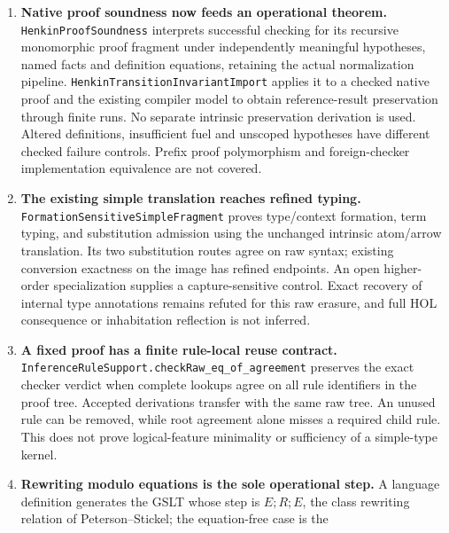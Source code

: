 \documentclass[11pt]{article}
\theoremstyle{definition}
\theoremstyle{remark}
\begin{document}
\begin{enumerate}
  \nolinkurl{DeclarationSpine.recoverTelescope} derives the complete typed
  substitution for an arbitrary finite declaration telescope under universe
  regularity and Pi qualification, retaining replay of the exact displayed
  result. The nonempty alias/identity signature instantiates the qualification
  without remaining conversion hypotheses: an observed ground result recovers a named
  argument type, and an invalid lambda argument is excluded.
\item \textbf{Native proof soundness now feeds an operational theorem.}
  \nolinkurl{HenkinProofSoundness} interprets successful checking for its
  recursive monomorphic proof fragment under independently meaningful
  hypotheses, named facts and definition equations, retaining the actual
  normalization pipeline. \nolinkurl{HenkinTransitionInvariantImport}
  applies it to a checked native proof and the existing compiler model to
  obtain reference-result preservation through finite runs. No separate
  intrinsic preservation derivation is used. Altered definitions, insufficient
  fuel and unscoped hypotheses have different checked failure controls.
  Prefix proof polymorphism and foreign-checker implementation equivalence
  are not covered.
\item \textbf{The existing simple translation reaches refined typing.}
  \nolinkurl{FormationSensitiveSimpleFragment} proves type/context formation,
  term typing, and substitution admission using the unchanged intrinsic
  atom/arrow translation. Its two substitution routes agree on raw syntax;
  existing conversion exactness on the image has refined endpoints. An open
  higher-order specialization supplies a capture-sensitive control. Exact
  recovery of internal type annotations remains refuted for this raw erasure,
  and full HOL consequence or inhabitation reflection is not inferred.
\item \textbf{A fixed proof has a finite rule-local reuse contract.}
  \nolinkurl{InferenceRuleSupport.checkRaw_eq_of_agreement} preserves the exact
  checker verdict when complete lookups agree on all rule identifiers in
  the proof tree. Accepted derivations transfer with the same raw tree.
  An unused rule can be removed, while root agreement alone misses a
  required child rule. This does not prove logical-feature minimality or
  sufficiency of a simple-type kernel.
\item \textbf{Rewriting modulo equations is the sole operational step.}  A
  language definition generates the GSLT whose step is $E;R;E$, the class
  rewriting relation of Peterson--Stickel; the equation-free case is the

\end{enumerate}
\end{document}
